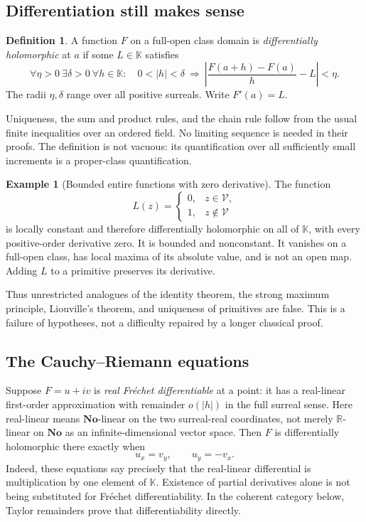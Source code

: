 \documentclass[11pt,oneside]{article}
\numberwithin{equation}{section}
\theoremstyle{definition}
\newtheorem{definition}[theorem]{Definition}
\newtheorem{example}[theorem]{Example}
\theoremstyle{remark}\newtheorem{remark}[theorem]{Remark}
\newcommand{\No}{\mathbf{No}}
\newcommand{\K}{\mathbb K}
\newcommand{\R}{\mathbb R}
\newcommand{\fin}{\mathcal V}
\begin{document}
\subsection{Differentiation still makes sense}
\begin{definition}
A function $F$ on a full-open class domain is \emph{differentially
holomorphic} at $a$ if some $L\in\K$ satisfies
\[
 \forall\eta>0\ \exists\delta>0\ \forall h\in\K:
 \quad 0<|h|<\delta\ \Longrightarrow\
 \left|\frac{F(a+h)-F(a)}h-L\right|<\eta.
\]
The radii $\eta,\delta$ range over all positive surreals. Write $F'(a)=L$.
\end{definition}
Uniqueness, the sum and product rules, and the chain rule follow from the
usual finite inequalities over an ordered field. No limiting sequence is
needed in their proofs. The definition is not vacuous: its quantification
over all sufficiently small increments is a proper-class quantification.

\begin{example}[Bounded entire functions with zero derivative]\label{ex:locallyconstant}
The function
\[
 L(z)=\begin{cases}0,&z\in\fin,\\1,&z\notin\fin\end{cases}
\]
is locally constant and therefore differentially holomorphic on all of
$\K$, with every positive-order derivative zero. It is bounded and
nonconstant. It vanishes on a full-open class, has local maxima of its
absolute value, and is not an open map. Adding $L$ to a primitive preserves
its derivative.
\end{example}
Thus unrestricted analogues of the identity theorem, the strong maximum
principle, Liouville's theorem, and uniqueness of primitives are false.
This is a failure of hypotheses, not a difficulty repaired by a longer
classical proof.

\subsection{The Cauchy--Riemann equations}
Suppose $F=u+iv$ is \emph{real Fr\'echet differentiable} at a point: it has
a real-linear first-order approximation with remainder $o(|h|)$ in the
full surreal sense. Here real-linear means $\No$-linear on the two
surreal-real coordinates, not merely $\R$-linear on $\No$ as an
infinite-dimensional vector space. Then $F$ is differentially holomorphic there exactly
when
\[
 u_x=v_y,\qquad u_y=-v_x.
\]
Indeed, these equations say precisely that the real-linear differential
is multiplication by one element of $\K$. Existence of partial derivatives
alone is not being substituted for Fr\'echet differentiability. In the
coherent category below, Taylor remainders prove that differentiability
directly.
\end{document}

